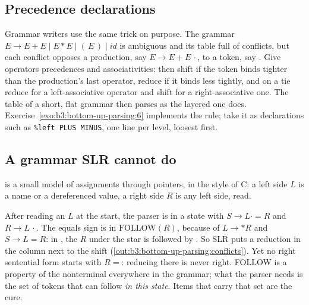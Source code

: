 \subsection{Precedence declarations}

Grammar writers use the same trick on purpose. The grammar $E \to E + E \mid E * E \mid (\,E\,) \mid \mathit{id}$ is ambiguous and its table full of conflicts, but each conflict opposes a production, say $E \to E + E\,\cdot$, to a token, say \code{*}. Give operators precedences and associativities: then shift if the token binds tighter than the production's last operator, reduce if it binds less tightly, and on a tie reduce for a left-associative operator and shift for a right-associative one. The table of a short, flat grammar then parses as the layered one does. Exercise~\ref{exo:b3:bottom-up-parsing:6} implements the rule;  take it as declarations such as \texttt{\%left PLUS MINUS}, one line per level, loosest first.

\subsection{A grammar SLR cannot do}

 is a small model of assignments through pointers, in the style of C: a left side $L$ is a name or a dereferenced value, a right side $R$ is any left side, read.

\label{lst:b3:bottom-up-parsing:lr}

After reading an $L$ at the start, the parser is in a state with $S \to L \cdot = R$ and $R \to L\,\cdot$. The equals sign is in $\mathrm{FOLLOW}(R)$, because of $L \to * R$ and $S \to L = R$: in , the $R$ under the star is followed by \code{=}. So SLR puts a reduction in the \code{=} column next to the shift (\cref{out:b3:bottom-up-parsing:conflicts}). Yet no right sentential form starts with $R =$: reducing there is never right. FOLLOW is a property of the nonterminal everywhere in the grammar; what the parser needs is the set of tokens that can follow \emph{in this state}. Items that carry that set are the cure.

